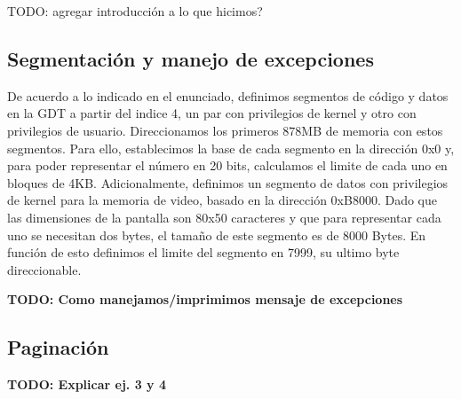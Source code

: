 TODO: agregar introducción a lo que hicimos?


\subsection{Segmentación y manejo de excepciones}

De acuerdo a lo indicado en el enunciado, definimos segmentos de código y datos en la GDT a partir del indice 4, un par con privilegios de kernel y otro con privilegios de usuario. 
Direccionamos los primeros $878$MB de memoria con estos segmentos.
Para ello, establecimos la base de cada segmento en la dirección 0x0 y, para poder representar el número en 20 bits, calculamos el limite de cada uno en bloques de 4KB. 
Adicionalmente, definimos un segmento de datos con privilegios de kernel para la memoria de video, basado en la dirección 0xB8000. Dado que las dimensiones de la pantalla son 80x50 caracteres y que para representar cada uno se necesitan dos bytes, el tamaño de este segmento es de 8000 Bytes. En función de esto definimos el limite del segmento en 7999, su ultimo byte direccionable.




\textbf{TODO: Como manejamos/imprimimos mensaje de excepciones}




\subsection{Paginación}

\textbf{TODO: Explicar ej. 3 y 4}

